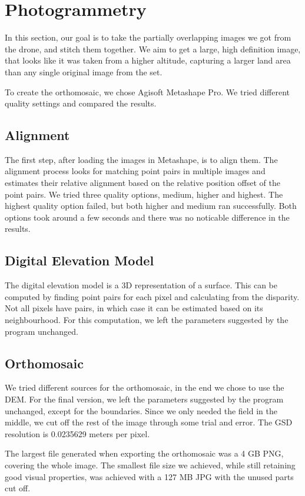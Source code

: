 \documentclass[../Head/Main.tex]{subfiles}
\begin{document}
\section{Photogrammetry}\label{sec:photo}
In this section, our goal is to take the partially overlapping images we got from the drone, and stitch them together.
We aim to get a large, high definition image, that looks like it was taken from a higher altitude, 
capturing a larger land area than any single original image from the set.

To create the orthomosaic, we chose Agisoft Metashape Pro. 
We tried different quality settings and compared the results.

\subsection{Alignment}

The first step, after loading the images in Metashape, is to align them.
The alignment process looks for matching point pairs in multiple images and estimates their relative alignment based on the relative position offset of the point pairs.
We tried three quality options, medium, higher and highest.
The highest quality option failed, but both higher and medium ran successfully.
Both options took around a few seconds and there was no noticable difference in the results.

\subsection{Digital Elevation Model}
The digital elevation model is a 3D representation of a surface.
This can be computed by finding point pairs for each pixel and calculating from the disparity.
Not all pixels have pairs, in which case it can be estimated based on its neighbourhood.
For this computation, we left the parameters suggested by the program unchanged.

\subsection{Orthomosaic}
We tried different sources for the orthomosaic, in the end we chose to use the DEM.
For the final version, we left the parameters suggested by the program unchanged, except for the boundaries.
Since we only needed the field in the middle, we cut off the rest of the image through some trial and error.
The GSD resolution is 0.0235629 meters per pixel.

The largest file generated when exporting the orthomosaic was a 4 GB PNG, covering the whole image. 
The smallest file size we achieved, while still retaining good visual properties, was achieved with a 127 MB JPG with the unused parts cut off.
\end{document}
